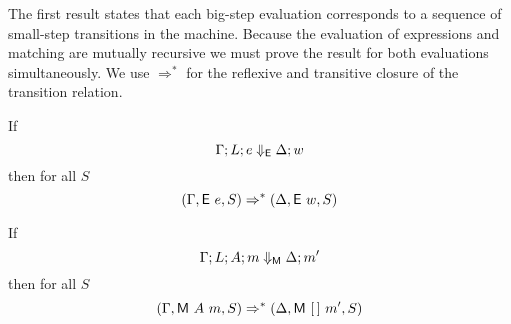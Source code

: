 The first result states that each big-step evaluation corresponds to a
sequence of small-step transitions in the machine.  Because the
evaluation of expressions and matching are mutually recursive we must
prove the result for both evaluations simultaneously.  We use
$\Rightarrow^{*}$ for the reflexive and transitive closure of the
transition relation.

\begin{theorem}
  If
  \[ \Gamma; L; e \Downarrow_{\textsf{E}} \Delta; w \]
  then for all $S$
  \[ (\Gamma, \textsf{E}~e,  S) \Rightarrow^{*}
    (\Delta, \textsf{E}~w, S)
  \]

  If
  \[ \Gamma; L; A; m \Downarrow_{\textsf{M}} \Delta; m'
  \]
  then for all $S$
  \[
    (\Gamma, \textsf{M}~A~m, S) \Rightarrow^{*}
    (\Delta, \textsf{M}~[\,]~m', S)
  \]
\end{theorem}

